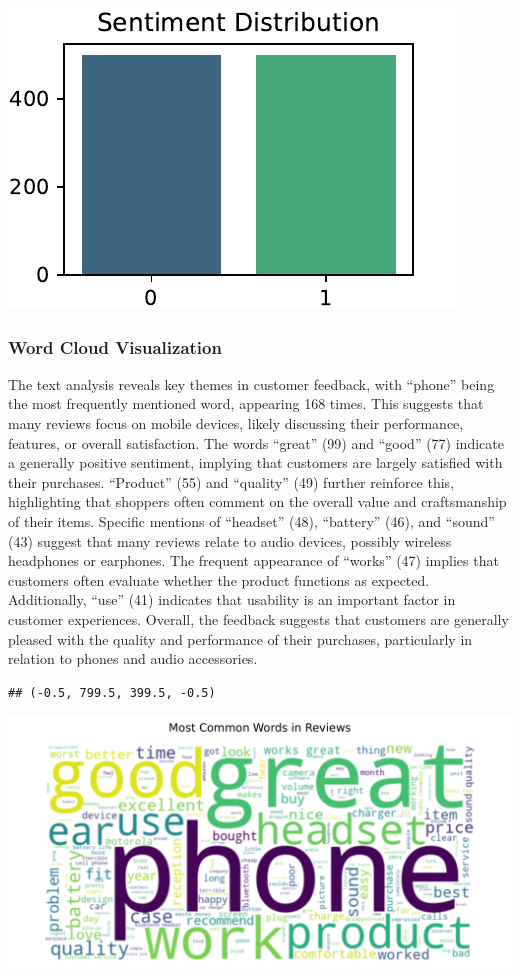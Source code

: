 \documentclass[preprint, 3p,
authoryear]{elsarticle} %
\begin{document}
\begin{center}\includegraphics[width=0.7\linewidth]{Final-Report_files/figure-latex/unnamed-chunk-5-1} \end{center}

\subsubsection{Word Cloud Visualization}\label{word-cloud-visualization}

The text analysis reveals key themes in customer feedback, with
``phone'' being the most frequently mentioned word, appearing 168 times.
This suggests that many reviews focus on mobile devices, likely
discussing their performance, features, or overall satisfaction. The
words ``great'' (99) and ``good'' (77) indicate a generally positive
sentiment, implying that customers are largely satisfied with their
purchases. ``Product'' (55) and ``quality'' (49) further reinforce this,
highlighting that shoppers often comment on the overall value and
craftsmanship of their items. Specific mentions of ``headset'' (48),
``battery'' (46), and ``sound'' (43) suggest that many reviews relate to
audio devices, possibly wireless headphones or earphones. The frequent
appearance of ``works'' (47) implies that customers often evaluate
whether the product functions as expected. Additionally, ``use'' (41)
indicates that usability is an important factor in customer experiences.
Overall, the feedback suggests that customers are generally pleased with
the quality and performance of their purchases, particularly in relation
to phones and audio accessories.

\begin{verbatim}
## (-0.5, 799.5, 399.5, -0.5)
\end{verbatim}

\begin{center}\includegraphics[width=0.7\linewidth]{Final-Report_files/figure-latex/unnamed-chunk-6-3} \end{center}
\end{document}
